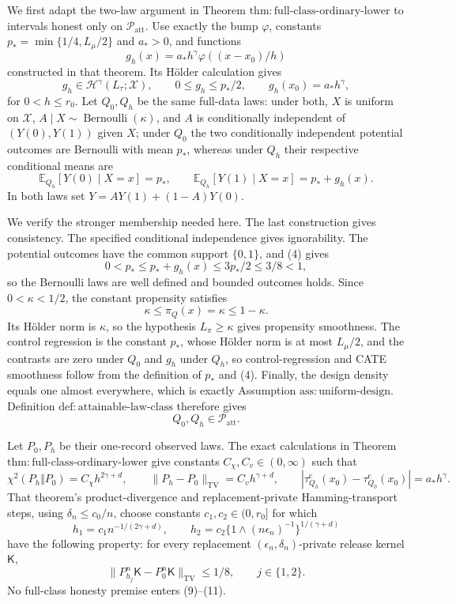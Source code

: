 We first adapt the two-law argument in Theorem
\(\mathrm{thm{:}full\text{-}class\text{-}ordinary\text{-}lower}\) to
intervals honest only on \(\mathcal P_{\mathrm{att}}\).  Use exactly the
bump \(\varphi\), constants \(p_*=\min\{1/4,L_\mu/2\}\) and \(a_*>0\),
and functions
\[
 g_h(x)=a_*h^\gamma\varphi((x-x_0)/h)
\tag{3}
\]
constructed in that theorem.  Its H\"older calculation gives
\[
 g_h\in\mathcal H^\gamma(L_\tau;\mathcal X),
 \qquad 0\le g_h\le p_*/2,
 \qquad g_h(x_0)=a_*h^\gamma,
\tag{4}
\]
for \(0<h\le r_0\).  Let \(Q_0,Q_h\) be the same full-data laws: under
both, \(X\) is uniform on \(\mathcal X\),
\(A\mid X\sim\operatorname{Bernoulli}(\kappa)\), and \(A\) is
conditionally independent of \((Y(0),Y(1))\) given \(X\); under \(Q_0\)
the two conditionally independent potential outcomes are Bernoulli with
mean \(p_*\), whereas under \(Q_h\) their respective conditional means are
\[
 \mathbb E_{Q_h}[Y(0)\mid X=x]=p_*,
 \qquad
 \mathbb E_{Q_h}[Y(1)\mid X=x]=p_*+g_h(x).
\tag{5}
\]
In both laws set \(Y=AY(1)+(1-A)Y(0)\).

We verify the stronger membership needed here.  The last construction
gives consistency.  The specified conditional independence gives
ignorability.  The potential outcomes have the common support
\(\{0,1\}\), and (4) gives
\[
 0<p_*\le p_*+g_h(x)\le3p_*/2\le3/8<1,
\tag{6}
\]
so the Bernoulli laws are well defined and bounded outcomes holds.  Since
\(0<\kappa<1/2\), the constant propensity satisfies
\[
 \kappa\le\pi_Q(x)=\kappa\le1-\kappa.
\tag{7}
\]
Its H\"older norm is \(\kappa\), so the hypothesis \(L_\pi\ge\kappa\)
gives propensity smoothness.  The control regression is the constant
\(p_*\), whose H\"older norm is at most \(L_\mu/2\), and the contrasts are
zero under \(Q_0\) and \(g_h\) under \(Q_h\), so control-regression and
CATE smoothness follow from the definition of \(p_*\) and (4).  Finally,
the design density equals one almost everywhere, which is exactly
Assumption \(\mathrm{ass{:}uniform\text{-}design}\).  Definition
\(\mathrm{def{:}attainable\text{-}law\text{-}class}\) therefore gives
\[
 Q_0,Q_h\in\mathcal P_{\mathrm{att}}.
\tag{8}
\]

Let \(P_0,P_h\) be their one-record observed laws.  The exact calculations
in Theorem \(\mathrm{thm{:}full\text{-}class\text{-}ordinary\text{-}lower}\)
give constants \(C_\chi,C_v\in(0,\infty)\) such that
\[
 \chi^2(P_h\Vert P_0)=C_\chi h^{2\gamma+d},
 \qquad
 \lVert P_h-P_0\rVert_{\mathrm{TV}}=C_vh^{\gamma+d},
 \qquad
 \left|\tau_{Q_h}^{\mathrm c}(x_0)
       -\tau_{Q_0}^{\mathrm c}(x_0)\right|=a_*h^\gamma.
\tag{9}
\]
That theorem's product-divergence and replacement-private Hamming-transport
steps, using \(\delta_n\le c_0/n\), choose constants
\(c_1,c_2\in(0,r_0]\) for which
\[
 h_1=c_1n^{-1/(2\gamma+d)},
 \qquad
 h_2=c_2\{1\wedge(n\epsilon_n)^{-1}\}^{1/(\gamma+d)}
\tag{10}
\]
have the following property: for every replacement
\((\epsilon_n,\delta_n)\)-private release kernel \(\mathsf K\),
\[
 \lVert P_{h_j}^n\mathsf K-P_0^n\mathsf K\rVert_{\mathrm{TV}}
 \le1/8,
 \qquad j\in\{1,2\}.
\tag{11}
\]
No full-class honesty premise enters (9)--(11).

